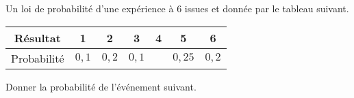 \begin{frame}{4}
	Un loi de probabilité d'une expérience à $6$ issues et donnée par le tableau suivant.
	\begin{center}
	\begin{tabular}{|c|c|c|c|c|c|c|} \hline
		Résultat & 1 & 2 & 3 & 4 & 5 & 6 \\ \hline
		Probabilité & $0,1$ & $0,2$ & $0,1$ &  & $0,25$ & $0,2$ \\ \hline
	\end{tabular}
	\end{center}
	Donner la probabilité de l'événement suivant.
	
\end{frame}


